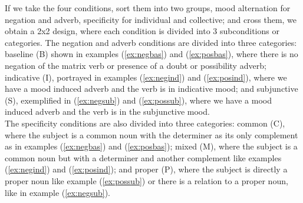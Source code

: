 \begin{exe}
  \label{ex:negbas}
  \label{ex:negind}
 \label{ex:negsub}
\end{exe}

If we take the four conditions, sort them into two groups, mood alternation for negation and adverb, specificity for individual and collective; and cross them, we obtain a 2x2 design, where each condition is divided into 3 subconditions or categories. The negation and adverb conditions are divided into three categories: baseline (B) shown in examples (\ref{ex:negbas}) and (\ref{ex:posbas}), where there is no negation of the matrix verb or presence of a doubt or possibility adverb; indicative (I), portrayed in examples (\ref{ex:negind}) and (\ref{ex:posind}), where we have a mood induced adverb and the verb is in indicative mood; and subjunctive (S), exemplified in (\ref{ex:negsub}) and (\ref{ex:possub}), where we have a mood induced adverb and the verb is in the subjunctive mood.\\ 

The specificity conditions are also divided into three categories: common (C), where the subject is a common noun with the determiner as its only complement as in examples (\ref{ex:negbas}) and (\ref{ex:posbas}); mixed (M), where the subject is a common noun but with a determiner and another complement like examples (\ref{ex:negind}) and (\ref{ex:posind}); and proper (P), where the subject is directly a proper noun like example (\ref{ex:possub}) or there is a relation to a proper noun, like in example (\ref{ex:negsub}).\\

